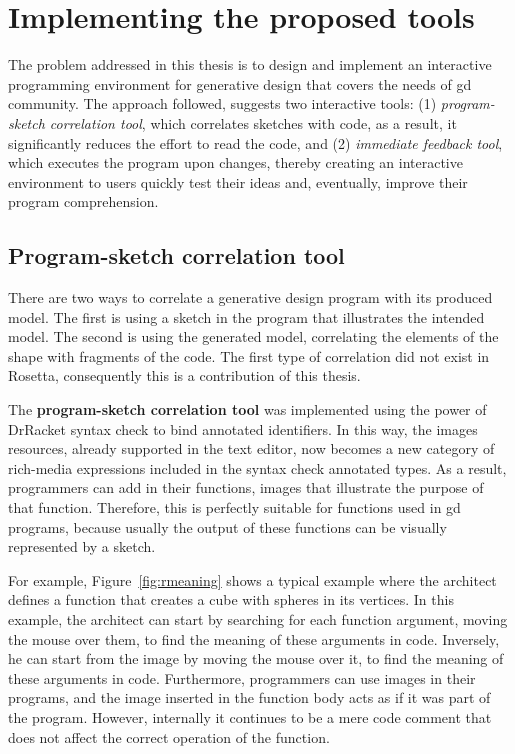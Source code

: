 
\section{Implementing the proposed tools}

The problem addressed in this thesis is to design and implement an interactive programming environment for generative design that covers the needs of \gls{gd} community. The approach followed, suggests two interactive tools: (1) \textit{program-sketch correlation tool}, which correlates sketches with code, as a result, it significantly reduces the effort to read the code, and (2) \textit{immediate feedback tool}, which executes the program upon changes, thereby creating an interactive environment to users quickly test their ideas and, eventually, improve their program comprehension.

\subsection{Program-sketch correlation tool}
\label{sec:psct}

There are two ways to correlate a generative design program with its produced model. The first is using a sketch in the program that illustrates the intended model. The second is using the generated model, correlating the elements of the shape with fragments of the code. The first type of correlation did not exist in Rosetta, consequently this is a contribution of this thesis.

The \textbf{program-sketch correlation tool} was implemented using the power of DrRacket syntax check to bind annotated identifiers. In this way, the images resources, already supported in the text editor, now becomes a new category of rich-media expressions included in the syntax check annotated types. As a result, programmers can add in their functions, images that illustrate the purpose of that function. Therefore, this is perfectly suitable for functions used in \gls{gd} programs, because usually the output of these functions can be visually represented by a sketch.

For example, Figure~\ref{fig:rmeaning} shows a typical example where the architect defines a function that creates a cube with spheres in its vertices. In this example, the architect can start by searching for each function argument, moving the mouse over them, to find the meaning of these arguments in code. Inversely, he can start from the image by moving the mouse over it, to find the meaning of these arguments in code. Furthermore, programmers can use images in their programs, and the image inserted in the function body acts as if it was part of the program. However, internally it continues to be a mere code comment that does not affect the correct operation of the function.    

